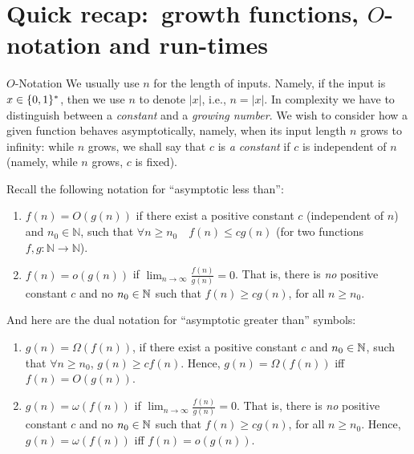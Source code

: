 \section{Quick recap:\ growth functions, $O$-notation and run-times}



\begin{trailer}{$O$-Notation}
    We usually use $n$ for the length of inputs. Namely, if the input is $x\in\{0,1\}^*$, then we use $n$ to denote $|x|$, i.e., $n=|x|$. In complexity we have to distinguish between a \emph{constant} and a \emph{growing number}. We wish to consider how a given function behaves asymptotically, namely, when its input length $n$ grows to infinity: while $n$ grows, we shall say that $c$ is \emph{a constant} if $c$ is independent of $n$ (namely, while $n$ grows, $c$ is fixed).  


Recall the following notation for ``asymptotic less than'':
\begin{enumerate}
    \item 
 $f(n)=O(g(n))$ if there exist a positive constant $c$ (independent of $n$) and $n_0 \in \mathbb{N}$, such that  $\forall n \geq n_0 \quad f(n) \leq c g(n) $ (for two functions  $f, g: \mathbb{N} \rightarrow \mathbb{N}$).

\item $f(n)=o(g(n))$ if $\lim _{n \rightarrow \infty} \frac{f(n)}{g(n)}=0$. That is, there is \emph{no} positive constant $c$ and no $n_0\in\mathbb{N}$ such that $f(n)\ge cg(n)$, for all $n\ge n_0$.
\end{enumerate}
And here are the dual notation for ``asymptotic greater than'' symbols:
\begin{enumerate}[resume]
\item $g(n)=\Omega(f(n))$, if there exist a positive constant $c$ and $n_0\in\mathbb{N}$, such that $\forall n \ge n_0$, $g(n)\ge cf(n)$. Hence, $g(n)=\Omega(f(n))$ iff $f(n)=O(g(n))$.
\item $g(n)=\omega(f(n))$ if $\lim _{n \rightarrow \infty} \frac{f(n)}{g(n)}=0$. That is, there is \emph{no} positive constant $c$ and no $n_0\in\mathbb{N}$ such that $f(n)\ge cg(n)$, for all $n\ge n_0$. Hence, $g(n)=\omega(f(n))$ iff $f(n)=o(g(n))$. \end{enumerate}
\end{trailer}

